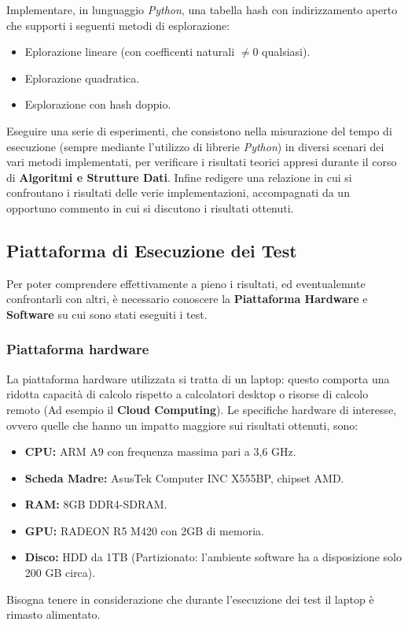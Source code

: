 \documentclass{article}
\begin{document}
Implementare, in lunguaggio \emph{Python}, una tabella hash con indirizzamento aperto che supporti i seguenti metodi di esplorazione:
\begin{itemize}
\item Eplorazione lineare (con coefficenti naturali $\neq 0$ qualsiasi).
\item Eplorazione quadratica.
\item Esplorazione con hash doppio.
\end{itemize}
Eseguire una serie di esperimenti, che consistono nella misurazione del tempo di esecuzione (sempre mediante l'utilizzo di librerie \emph{Python}) in diversi scenari dei vari metodi implementati, per verificare i risultati teorici appresi durante il corso di \textbf{Algoritmi e Strutture Dati}.
Infine redigere una relazione in cui si confrontano i risultati delle verie implementazioni, accompagnati da un opportuno commento in cui si discutono i risultati ottenuti.

\subsection{Piattaforma di Esecuzione dei Test}

Per poter comprendere effettivamente a pieno i risultati, ed eventualemnte confrontarli con altri, è necessario conoscere la \textbf{Piattaforma Hardware} e \textbf{Software} su cui sono stati eseguiti i test.
\subsubsection{Piattaforma hardware}

La piattaforma hardware utilizzata si tratta di un laptop: questo comporta una ridotta capacità di calcolo rispetto a calcolatori desktop o risorse di calcolo remoto (Ad esempio il \textbf{Cloud Computing}).
Le specifiche hardware di interesse, ovvero quelle che hanno un impatto maggiore sui risultati ottenuti, sono:
\begin{itemize}
\item \textbf{CPU:} ARM A9 con frequenza massima pari a 3,6 GHz.
\item \textbf{Scheda Madre:} AsusTek Computer INC X555BP, chipset AMD.
\item \textbf{RAM:} 8GB DDR4-SDRAM.
\item \textbf{GPU:} RADEON R5 M420 con 2GB di memoria.
\item \textbf{Disco:} HDD da 1TB (Partizionato: l'ambiente software ha a disposizione solo 200 GB circa).
\end{itemize} 
Bisogna tenere in considerazione che durante l'esecuzione dei test il laptop è rimasto alimentato.
\end{document}
